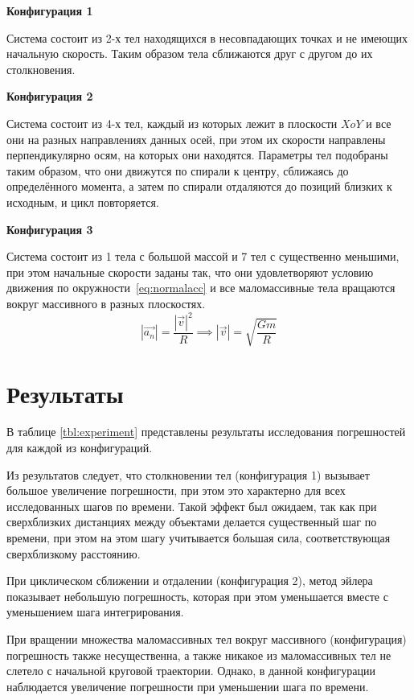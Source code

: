 \textbf{Конфигурация 1}

Система состоит из 2-х тел находящихся в несовпадающих точках и не имеющих начальную скорость. Таким образом тела сближаются друг с другом до их столкновения.

\textbf{Конфигурация 2}

Система состоит из 4-х тел, каждый из которых лежит в плоскости $XoY$ и все они на разных направлениях данных осей, при этом их скорости направлены перпендикулярно осям, на которых они находятся. Параметры тел подобраны таким образом, что они движутся по спирали к центру, сближаясь до определённого момента, а затем по спирали отдаляются до позиций близких к исходным, и цикл повторяется.

\textbf{Конфигурация 3}

Система состоит из 1 тела с большой массой и 7 тел с  существенно меньшими, при этом начальные скорости заданы так, что они удовлетворяют условию движения по окружности~\ref{eq:normalacc} и все маломассивные тела вращаются вокруг массивного в разных плоскостях. 
\begin{equation}
	\label{eq:normalacc}
	|\vec{a_n}| = \frac{|\vec{v}|^2}{R} \implies |\vec{v}| = \sqrt{\frac{Gm}{R}}
\end{equation}

\section{Результаты}

В таблице \ref{tbl:experiment} представлены результаты исследования погрешностей для каждой из конфигураций.

Из результатов следует, что столкновении тел (конфигурация 1) вызывает большое увеличение погрешности, при этом это характерно для всех исследованных шагов по времени. Такой эффект был ожидаем, так как при сверхблизких дистанциях между объектами делается существенный шаг по времени, при этом на этом шагу учитывается большая сила, соответствующая сверхблизкому расстоянию.

При циклическом сближении и отдалении (конфигурация 2), метод эйлера показывает небольшую погрешность, которая при этом уменьшается вместе с уменьшением шага интегрирования.

При вращении множества маломассивных тел вокруг массивного (конфигурация) погрешность также несущественна, а также никакое из маломассивных тел не слетело с начальной круговой траектории. Однако, в данной конфигурации наблюдается увеличение погрешности при уменьшении шага по времени.


